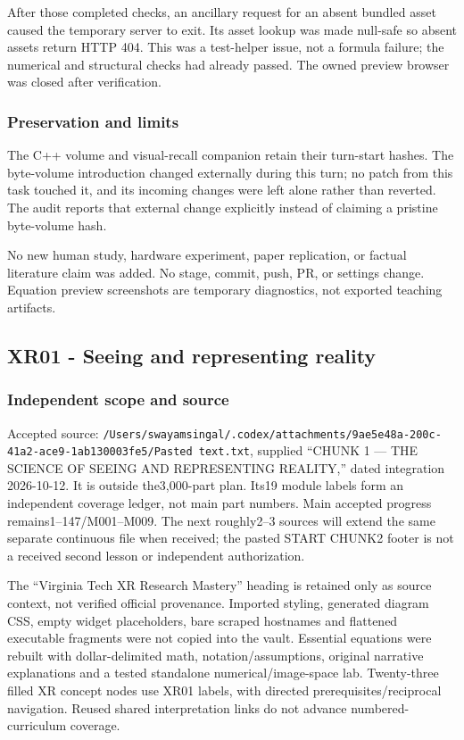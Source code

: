After those completed checks, an ancillary request for an absent bundled asset caused the temporary server to exit. Its asset lookup was made null-safe so absent assets return HTTP 404. This was a test-helper issue, not a formula failure; the numerical and structural checks had already passed. The owned preview browser was closed after verification.

\subsubsection{Preservation and limits}\label{appendix-a103e7846d21-preservation-and-limits}

The C++ volume and visual-recall companion retain their turn-start hashes. The byte-volume introduction changed externally during this turn; no patch from this task touched it, and its incoming changes were left alone rather than reverted. The audit reports that external change explicitly instead of claiming a pristine byte-volume hash.

No new human study, hardware experiment, paper replication, or factual literature claim was added. No stage, commit, push, PR, or settings change. Equation preview screenshots are temporary diagnostics, not exported teaching artifacts.

\subsection{XR01 - Seeing and representing reality}\label{appendix-a103e7846d21-xr01---seeing-and-representing-reality}

\subsubsection{Independent scope and source}\label{appendix-a103e7846d21-independent-scope-and-source}

Accepted source: \texttt{/Users/swayamsingal/.codex/attachments/9ae5e48a-200c-41a2-ace9-1ab130003fe5/Pasted\ text.txt}, supplied ``CHUNK 1 --- THE SCIENCE OF SEEING AND REPRESENTING REALITY,'' dated integration 2026-10-12. It is outside the3,000-part plan. Its19 module labels form an independent coverage ledger, not main part numbers. Main accepted progress remains1--147/M001--M009. The next roughly2--3 sources will extend the same separate continuous file when received; the pasted START CHUNK2 footer is not a received second lesson or independent authorization.

The ``Virginia Tech XR Research Mastery'' heading is retained only as source context, not verified official provenance. Imported styling, generated diagram CSS, empty widget placeholders, bare scraped hostnames and flattened executable fragments were not copied into the vault. Essential equations were rebuilt with dollar-delimited math, notation/assumptions, original narrative explanations and a tested standalone numerical/image-space lab. Twenty-three filled XR concept nodes use XR01 labels, with directed prerequisites/reciprocal navigation. Reused shared interpretation links do not advance numbered-curriculum coverage.

